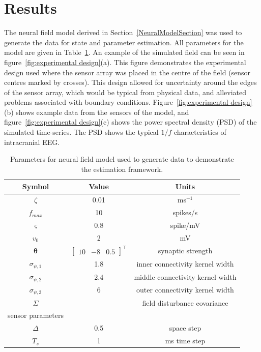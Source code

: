 \documentclass[twocolumn,11pt,a4paper]{article}		%
\begin{document}
\section{Results}\label{ResultsSection} The neural field model derived in Section~\ref{NeuralModelSection} was used to generate the data for state and parameter estimation. All parameters for the model are given in Table~\ref{tab:Model Parameters}. An example of the simulated field can be seen in figure~\ref{fig:experimental design}(a). This figure demonstrates the experimental design used where the sensor array was placed in the centre of the field (sensor centres marked by crosses). This design allowed for uncertainty around the edges of the sensor array, which would be typical from physical data, and alleviated problems associated with boundary conditions. Figure~\ref{fig:experimental design}(b) shows example data from the sensors of the model, and figure~\ref{fig:experimental design}(c) shows the power spectral density (PSD) of the simulated time-series. The PSD shows the typical $1/f$ characteristics of intracranial EEG.
\begin{table}
	
\centering
\begin{tabular}{c|c|c}
	\hline\hline Symbol & Value & Units \\
	\hline\hline
	$\zeta$ & 0.01 & ms$^{-1}$\\
	$f_{max}$ & 10 & spikes/s \\
	$\varsigma$ & 0.8 & spike/mV\\
	$v_0$ & 2 & mV\\
	$\boldsymbol{\theta}$ & $\left[\begin{array}{ccc}
	10 &-8 &0.5
	\end{array}
	\right]^{\top}$ & synaptic strength\\
	$\sigma_{\psi,1}$ & 1.8 & inner connectivity kernel width\\
	$\sigma_{\psi,2}$ & 2.4 & middle connectivity kernel width\\
	$\sigma_{\psi,3}$ & 6 & outer connectivity kernel width\\
	$\Sigma$ & & field disturbance covariance \\
	sensor parameters & & \\
	$\Delta$ & 0.5 & space step \\
	$T_s$ & 1 & ms time step \\ 
	\hline\hline
\end{tabular}\label{tab:Model Parameters}
\caption{Parameters for neural field model used to generate data to demonstrate the estimation framework.}
\end{table}
\end{document}
